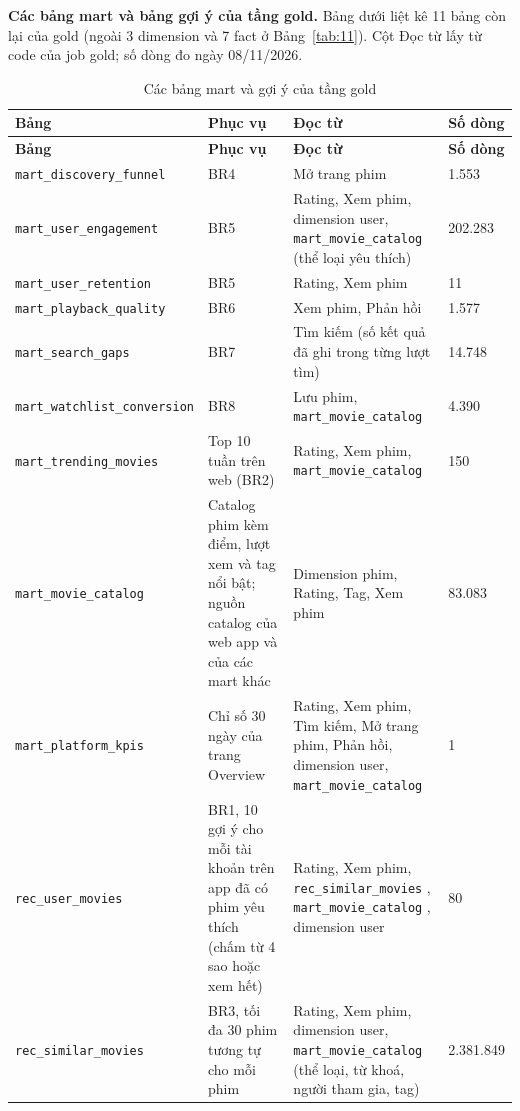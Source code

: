 \documentclass[a4paper,11pt]{article}
\newlength{\reporttablewidth}
\newcommand{\dbsep}{\_\allowbreak}
\begin{document}
\textbf{Các bảng mart và bảng gợi ý của tầng gold.} Bảng dưới liệt kê 11 bảng còn lại của gold (ngoài 3 dimension và 7 fact ở Bảng~\ref{tab:11}). Cột Đọc từ lấy từ code của job gold; số dòng đo ngày 08/11/2026.

\begingroup
\small
{}
\setlength{\tabcolsep}{4pt}
\renewcommand{\arraystretch}{1.18}
\setlength{\reporttablewidth}{\dimexpr\linewidth-6\tabcolsep\relax}
\begin{longtable}{@{}L{0.37\reporttablewidth} L{0.12\reporttablewidth} L{0.35\reporttablewidth} L{0.16\reporttablewidth}@{}}
\caption[Các bảng mart và gợi ý của tầng gold (Phụ lục E)]{Các bảng mart và gợi ý của tầng gold}\label{tab:28} \\
\toprule
\textbf{Bảng} & \textbf{Phục vụ} & \textbf{Đọc từ} & \textbf{Số dòng} \\
\midrule
\endfirsthead
\toprule
\textbf{Bảng} & \textbf{Phục vụ} & \textbf{Đọc từ} & \textbf{Số dòng} \\
\midrule
\endhead
\midrule
\endfoot
\bottomrule
\endlastfoot
\texttt{mart\dbsep{}discovery\dbsep{}funnel} & BR4 & Mở trang phim & 1.553 \\
\texttt{mart\dbsep{}user\dbsep{}engagement} & BR5 & Rating, Xem phim, dimension user, \texttt{mart\dbsep{}movie\dbsep{}catalog} (thể loại yêu thích) & 202.283 \\
\texttt{mart\dbsep{}user\dbsep{}retention} & BR5 & Rating, Xem phim & 11 \\
\texttt{mart\dbsep{}playback\dbsep{}quality} & BR6 & Xem phim, Phản hồi & 1.577 \\
\texttt{mart\dbsep{}search\dbsep{}gaps} & BR7 & Tìm kiếm (số kết quả đã ghi trong từng lượt tìm) & 14.748 \\
\texttt{mart\dbsep{}watchlist\dbsep{}conversion} & BR8 & Lưu phim, \texttt{mart\dbsep{}movie\dbsep{}catalog} & 4.390 \\
\texttt{mart\dbsep{}trending\dbsep{}movies} & Top 10 tuần trên web (BR2) & Rating, Xem phim, \texttt{mart\dbsep{}movie\dbsep{}catalog} & 150 \\
\texttt{mart\dbsep{}movie\dbsep{}catalog} & Catalog phim kèm điểm, lượt xem và tag nổi bật; nguồn catalog của web app và của các mart khác & Dimension phim, Rating, Tag, Xem phim & 83.083 \\
\texttt{mart\dbsep{}platform\dbsep{}kpis} & Chỉ số 30 ngày của trang Overview & Rating, Xem phim, Tìm kiếm, Mở trang phim, Phản hồi, dimension user, \texttt{mart\dbsep{}movie\dbsep{}catalog} & 1 \\
\texttt{rec\dbsep{}user\dbsep{}movies} & BR1, 10 gợi ý cho mỗi tài khoản trên app đã có phim yêu thích (chấm từ 4 sao hoặc xem hết) & Rating, Xem phim, \texttt{rec\dbsep{}similar\dbsep{}movies} , \texttt{mart\dbsep{}movie\dbsep{}catalog} , dimension user & 80 \\
\texttt{rec\dbsep{}similar\dbsep{}movies} & BR3, tối đa 30 phim tương tự cho mỗi phim & Rating, Xem phim, dimension user, \texttt{mart\dbsep{}movie\dbsep{}catalog} (thể loại, từ khoá, người tham gia, tag) & 2.381.849 \\
\end{longtable}
\endgroup
\end{document}

